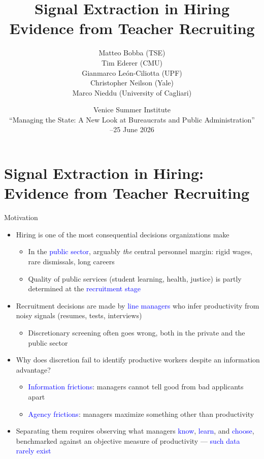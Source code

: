 \documentclass[compress,10pt,aspectratio=169]{beamer}
\title[Signal Extraction in Hiring]{\LARGE{Signal Extraction in Hiring}\\ \Large{Evidence from Teacher Recruiting}}
\date[Venice SI, June 2026]{Venice Summer Institute\\ \smallskip
{\small ``Managing the State: A New Look at Bureaucrats and Public Administration''}\\ \medskip
24--25 June 2026}
\author[Gianmarco Le\'on-Ciliotta (UPF)]{Matteo Bobba (TSE)\\ Tim Ederer (CMU)\\ Gianmarco Le\'on-Ciliotta (UPF)\\ Christopher Neilson (Yale)\\ Marco Nieddu (University of Cagliari)}
\newcommand\emphblue[1]{\textcolor{blue}{#1}}
\begin{document}
{
\begin{frame}
\titlepage
\end{frame}
} %

\section{Signal Extraction in Hiring: Evidence from Teacher Recruiting}

\begin{frame}{Motivation}
    \begin{itemize}
        \item Hiring is one of the most consequential decisions organizations make
        \smallskip
        \begin{itemize}
            \item[$\Rightarrow$] In the \emphblue{public sector}, arguably \emph{the} central personnel margin: rigid wages, rare dismissals, long careers
            \smallskip
            \item[$\Rightarrow$] Quality of public services (student learning, health, justice) is partly determined at the \emphblue{recruitment stage}
        \end{itemize}
        \medskip
        \item Recruitment decisions are made by \emphblue{line managers} who infer productivity from noisy signals (resumes, tests, interviews)
        \begin{itemize}
        \smallskip
            \item[$\Rightarrow$] Discretionary screening often goes wrong, both in the private and the public sector
        \end{itemize}
        \medskip
        \item Why does discretion fail to identify productive workers despite an information advantage?
        \begin{itemize}
        \smallskip
        \item[$\Rightarrow$] \emphblue{Information frictions}: managers cannot tell good from bad applicants apart
        \medskip
        \item[$\Rightarrow$] \emphblue{Agency frictions}: managers maximize something other than productivity
        \end{itemize}
        \medskip
        \item Separating them requires observing what managers \emphblue{know}, \emphblue{learn}, and \emphblue{choose}, benchmarked against an objective measure of productivity --- \emphblue{such data rarely exist}
    \end{itemize}
\end{frame}
\end{document}
